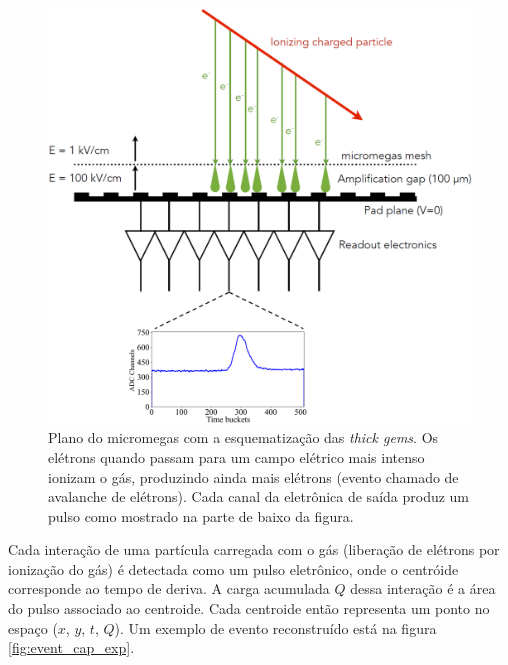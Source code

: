 \documentclass[a4paper,12pt,oneside]{book}
\begin{document}
\begin{figure}[H]
    \centering
    \includegraphics[scale = 0.40]{figs/thick_gems_2.png}
    \caption{Plano do micromegas com a esquematização das \textit{thick gems}. Os elétrons quando passam para um campo elétrico mais intenso ionizam o gás, produzindo ainda mais elétrons (evento chamado de avalanche de elétrons). Cada canal da eletrônica de saída produz um pulso como mostrado na parte de baixo da figura.}
    \label{fig:thick_gems}
\end{figure}


\par Cada interação de uma partícula carregada com o gás (liberação de elétrons por ionização do gás) é detectada como um pulso eletrônico, onde o centróide corresponde ao tempo de deriva. A carga acumulada $Q$ dessa interação é a área do pulso associado ao centroide. Cada centroide então representa um ponto no espaço ($x$, $y$, $t$, $Q$). Um exemplo de evento reconstruído está na figura \ref{fig:event_cap_exp}.
\end{document}
